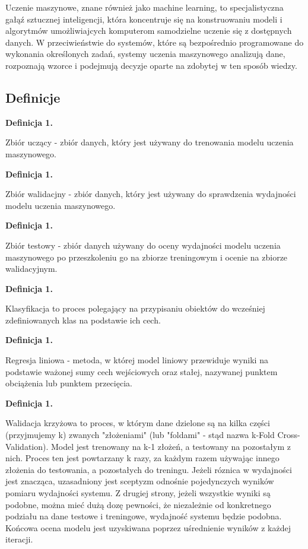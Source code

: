 Uczenie maszynowe, znane również jako machine learning, to specjalistyczna gałąź sztucznej inteligencji,
która koncentruje się na konstruowaniu modeli i algorytmów umożliwiajcych komputerom samodzielne uczenie się z dostępnych danych.
W przeciwieństwie do systemów, które są bezpośrednio programowane do wykonania określonych zadań,
systemy uczenia maszynowego analizują dane, rozpoznają wzorce i podejmują decyzje oparte na zdobytej w ten sposób wiedzy.

\subsection{Definicje}

\newcommand{\mlDefinitionIndex}{1}
\newcommand{\incrementMlDefinitionIndex} {
    \pgfmathtruncatemacro{\mlDefinitionIndex}{\mlDefinitionIndex + 1}
}

\noindent
\textbf{Definicja \mlDefinitionIndex.}
\incrementMlDefinitionIndex
Zbiór uczący - zbiór danych, który jest używany do trenowania modelu uczenia maszynowego.

\noindent
\textbf{Definicja \mlDefinitionIndex.}
\incrementMlDefinitionIndex
Zbiór walidacjny - zbiór danych, który jest używany do sprawdzenia wydajności modelu uczenia maszynowego.

\noindent
\textbf{Definicja \mlDefinitionIndex.}
\incrementMlDefinitionIndex
Zbiór testowy - zbiór danych używany do oceny wydajności modelu uczenia maszynowego
po przeszkoleniu go na zbiorze treningowym i ocenie na zbiorze walidacyjnym.

\noindent
\textbf{Definicja \mlDefinitionIndex.}
\incrementMlDefinitionIndex
Klasyfikacja to proces polegający na przypisaniu obiektów do wcześniej zdefiniowanych klas na podstawie ich cech.

\noindent
\textbf{Definicja \mlDefinitionIndex.}
\incrementMlDefinitionIndex
Regresja liniowa - metoda, w której model liniowy przewiduje wyniki na podstawie ważonej sumy cech wejściowych oraz stałej,
nazywanej punktem obciążenia lub punktem przecięcia.

\noindent
\textbf{Definicja \mlDefinitionIndex.}
\incrementMlDefinitionIndex
Walidacja krzyżowa to proces, w którym dane dzielone są na kilka części (przyjmujemy k) zwanych "złożeniami"
(lub "foldami" - stąd nazwa k-Fold Cross-Validation). Model jest trenowany na k-1 złożeń, a testowany na pozostałym z nich.
Proces ten jest powtarzany k razy, za każdym razem używając innego złożenia do testowania, a pozostałych do treningu.
Jeżeli róznica w wydajności jest znacząca, uzasadniony jest sceptyzm odnośnie pojedynczych wyników pomiaru wydajności systemu.
Z drugiej strony, jeżeli wszystkie wyniki są podobne, można mieć dużą dozę pewności, że niezależnie od konkretnego podziału
na dane testowe i treningowe, wydajność systemu będzie podobna.
Końcowa ocena modelu jest uzyskiwana poprzez uśrednienie wyników z każdej iteracji.

